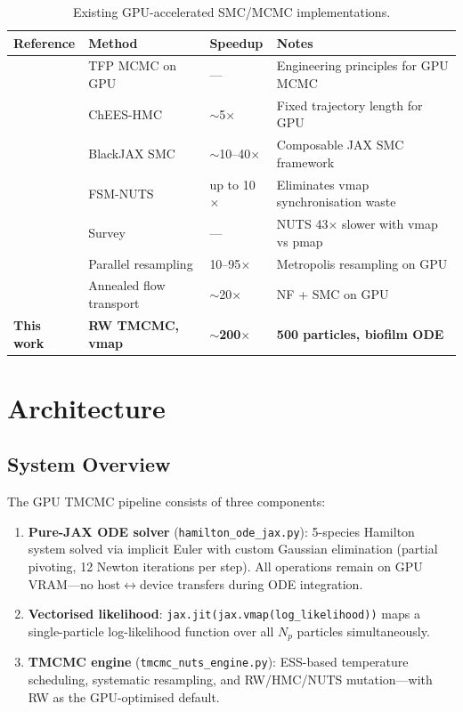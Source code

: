 \documentclass[11pt,a4paper]{article}
\begin{document}
\begin{table}[htbp]
\centering
\caption{Existing GPU-accelerated SMC/MCMC implementations.}
\label{tab:related_gpu_smc}
\begin{tabular}{@{}llll@{}}
\toprule
\textbf{Reference} & \textbf{Method} & \textbf{Speedup} & \textbf{Notes} \\
\midrule
\cite{Lao2020}           & TFP MCMC on GPU          & ---     & Engineering principles for GPU MCMC \\
\cite{Hoffman2021}       & ChEES-HMC                & $\sim$5$\times$ & Fixed trajectory length for GPU \\
\cite{Cabezas2024}       & BlackJAX SMC             & $\sim$10--40$\times$ & Composable JAX SMC framework \\
\cite{Dance2025}         & FSM-NUTS                 & up to 10$\times$ & Eliminates vmap synchronisation waste \\
\cite{Sountsov2024}      & Survey                   & ---     & NUTS 43$\times$ slower with vmap vs pmap \\
\cite{Murray2016}        & Parallel resampling      & 10--95$\times$ & Metropolis resampling on GPU \\
\cite{Arbel2021}         & Annealed flow transport  & $\sim$20$\times$ & NF + SMC on GPU \\
\textbf{This work}        & \textbf{RW TMCMC, vmap}  & \textbf{$\sim$200$\times$} & \textbf{500 particles, biofilm ODE} \\
\bottomrule
\end{tabular}
\end{table}


\section{Architecture}
\label{sec:gpu_architecture}

\subsection{System Overview}

The GPU TMCMC pipeline consists of three components:

\begin{enumerate}
  \item \textbf{Pure-JAX ODE solver} (\texttt{hamilton\_ode\_jax.py}):
    5-species Hamilton system solved via implicit Euler with custom
    Gaussian elimination (partial pivoting, 12 Newton iterations per step).
    All operations remain on GPU VRAM---no host$\leftrightarrow$device transfers
    during ODE integration.
  \item \textbf{Vectorised likelihood}:
    \texttt{jax.jit(jax.vmap(log\_likelihood))} maps a single-particle
    log-likelihood function over all $N_p$ particles simultaneously.
  \item \textbf{TMCMC engine} (\texttt{tmcmc\_nuts\_engine.py}):
    ESS-based temperature scheduling, systematic resampling, and
    RW/HMC/NUTS mutation---with RW as the GPU-optimised default.
\end{enumerate}
\end{document}
